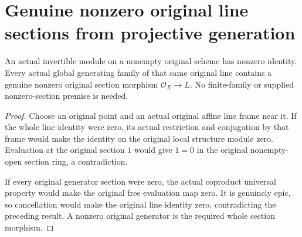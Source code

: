 \section{Genuine nonzero original line sections from projective generation}

\begin{theorem}
\label{thm:fc-original-line-nonzero-generator}
\leanok
{}
An actual invertible module on a nonempty original scheme has nonzero
identity. Every actual global generating family of that same original
line contains a genuine nonzero original section morphism
$\mathcal O_X\to L$. No finite-family or supplied nonzero-section premise
is needed.
\end{theorem}
\begin{proof}
Choose an original point and an actual original affine line frame near
it. If the whole line identity were zero, its actual restriction and
conjugation by that frame would make the identity on the original local
structure module zero. Evaluation at the original section $1$ would give
$1=0$ in the original nonempty-open section ring, a contradiction.

If every original generator section were zero, the actual coproduct
universal property would make the original free evaluation map zero.
It is genuinely epic, so cancellation would make the original line
identity zero, contradicting the preceding result. A nonzero original
generator is the required whole section morphism.
\end{proof}

